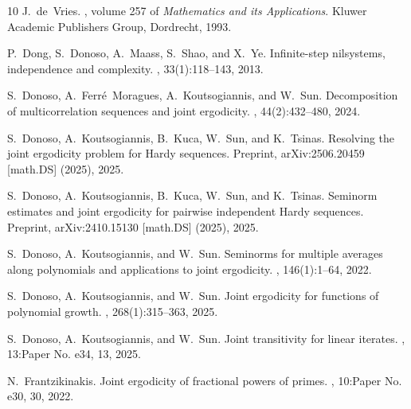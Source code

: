\documentclass[11pt,reqno]{amsart}
\theoremstyle{definition}
\theoremstyle{remark}
\begin{document}
\begin{thebibliography}{10}
J.~de~Vries.
, volume 257 of {\em Mathematics and its Applications}.
\newblock Kluwer Academic Publishers Group, Dordrecht, 1993.

P.~Dong, S.~Donoso, A.~Maass, S.~Shao, and X.~Ye.
\newblock Infinite-step nilsystems, independence and complexity.
, 33(1):118--143, 2013.

S.~Donoso, A.~Ferr\'{e}~Moragues, A.~Koutsogiannis, and W.~Sun.
\newblock Decomposition of multicorrelation sequences and joint ergodicity.
, 44(2):432--480, 2024.

S.~Donoso, A.~Koutsogiannis, B.~Kuca, W.~Sun, and K.~Tsinas.
\newblock Resolving the joint ergodicity problem for {Hardy} sequences.
\newblock Preprint, {arXiv}:2506.20459 [math.{DS}] (2025), 2025.

S.~Donoso, A.~Koutsogiannis, B.~Kuca, W.~Sun, and K.~Tsinas.
\newblock Seminorm estimates and joint ergodicity for pairwise independent {Hardy} sequences.
\newblock Preprint, {arXiv}:2410.15130 [math.{DS}] (2025), 2025.

S.~Donoso, A.~Koutsogiannis, and W.~Sun.
\newblock Seminorms for multiple averages along polynomials and applications to joint ergodicity.
, 146(1):1--64, 2022.

S.~Donoso, A.~Koutsogiannis, and W.~Sun.
\newblock Joint ergodicity for functions of polynomial growth.
, 268(1):315--363, 2025.

S.~Donoso, A.~Koutsogiannis, and W.~Sun.
\newblock Joint transitivity for linear iterates.
, 13:Paper No. e34, 13, 2025.

N.~Frantzikinakis.
\newblock Joint ergodicity of fractional powers of primes.
, 10:Paper No. e30, 30, 2022.


\end{thebibliography}
\end{document}
